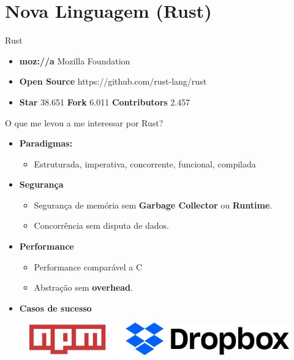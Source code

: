 \section{Nova Linguagem (Rust)}

\begin{frame}[fragile]{Rust}
\begin{figure}[ht!]
  \centering
  
\end{figure}
\begin{itemize}
    \item \textbf{moz://a} Mozilla Foundation
    \item \textbf{Open Source} https://github.com/rust-lang/rust
    \item \textbf{Star} 38.651  \textbf{Fork} 6.011 \textbf{Contributors} 2.457
\end{itemize}
\end{frame}

\begin{frame}[fragile]{O que me levou a me interessar por Rust?}
\begin{center}
\begin{itemize}
    \item \textbf{Paradigmas:}
    \begin{itemize}
        \item Estruturada, imperativa, concorrente, funcional, compilada
    \end{itemize}{}
    \item \textbf{Segurança}
    \begin{itemize}
        \item Segurança de memória sem \textbf{Garbage Collector} ou \textbf{Runtime}.
        \item Concorrência sem disputa de dados.
    \end{itemize}
    \item \textbf{Performance}
    \begin{itemize}
        \item Performance comparável a C
        \item Abstração sem \textbf{overhead}.
    \end{itemize}{}
    \item \textbf{Casos de sucesso}
\end{itemize}
\end{center}
\begin{center}
    \begin{figure}[ht!]
  \centering
  \includegraphics[scale=0.6]{images/cases.png}
\end{figure}
\end{center}{}
\end{frame}

